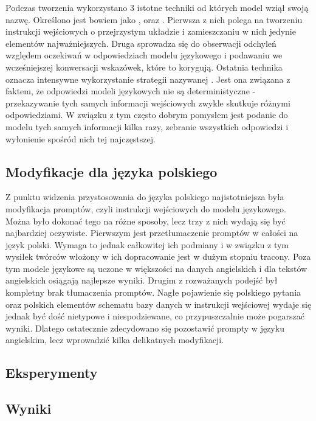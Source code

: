Podczas tworzenia  wykorzystano 3 istotne techniki od których model wziął swoją nazwę. Określono jest bowiem jako ,  oraz . Pierwsza z nich polega na tworzeniu instrukcji wejściowych o przejrzystym układzie i zamieszczaniu w nich jedynie elementów najważniejszych. Druga sprowadza się do obserwacji odchyleń względem oczekiwań w odpowiedziach modelu językowego i podawaniu we wcześniejszej konwersacji wskazówek, które to korygują. Ostatnia technika oznacza intensywne wykorzystanie strategii nazywanej  \cite{Wang2022}. Jest ona związana z faktem, że odpowiedzi modeli językowych nie są deterministyczne - przekazywanie tych samych informacji wejściowych zwykle skutkuje różnymi odpowiedziami. W związku z tym często dobrym pomysłem jest podanie do modelu tych samych informacji kilka razy, zebranie wszystkich odpowiedzi i wyłonienie spośród nich tej najczęstszej.

\subsection{Modyfikacje dla języka polskiego}
Z punktu widzenia przystosowania  do języka polskiego najistotniejsza była modyfikacja promptów, czyli instrukcji wejściowych do modelu językowego. Można było dokonać tego na różne sposoby, lecz trzy z nich wydają się być najbardziej oczywiste. Pierwszym jest przetłumaczenie promptów w całości na język polski. Wymaga to jednak całkowitej ich podmiany i w związku z tym wysiłek twórców włożony w ich dopracowanie jest w dużym stopniu tracony. Poza tym modele językowe są uczone w większości na danych angielskich i dla tekstów angielskich osiągają najlepsze wyniki. Drugim z rozważanych podejść był kompletny brak tłumaczenia promptów. Nagłe pojawienie się polskiego pytania oraz polskich elementów schematu bazy danych w instrukcji wejściowej wydaje się jednak być dość nietypowe i niespodziewane, co przypuszczalnie może pogarszać wyniki. Dlatego ostatecznie zdecydowano się pozostawić prompty w języku angielskim, lecz wprowadzić kilka delikatnych modyfikacji.

\subsection{Eksperymenty}

\subsection{Wyniki}


